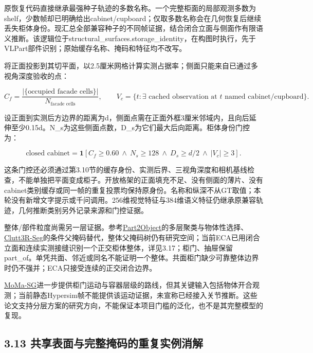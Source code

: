 \documentclass[UTF8,fontset=fandol]{ctexart}
\begin{document}
原恢复代码直接继承最强种子轨迹的多数名称。一个完整柜面的局部观测多数为shelf，少数帧却已明确给出cabinet/cupboard；仅取多数名称会在几何恢复后继续丢失柜体身份。现汇总全部兼容种子的不同帧证据，结合闭合立面与侧面作有限语义推断。该逻辑位于structural\_surfaces.storage\_identity，在构图时执行，先于VLPart部件识别；原始缓存名称、掩码和特征均不改写。



将正面投影到其切平面，以2.5厘米网格计算实测占据率；侧面只能来自已通过多视角深度验收的点：



\[
C_f=\frac{|\{\text{occupied facade cells}\}|}{N_{\text{facade cells}}},\qquad
V_c=\{t:\exists\text{ cached observation at }t\text{ named cabinet/cupboard}\}.
\]

设正面到实测后方边界的距离为d，侧面点需在正面外框3厘米邻域内，且向后延伸至少0.15d。N\_s为这些侧面点数，D\_s为它们最大后向距离。柜体身份门控为：



\[
\text{closed cabinet}=\mathbf1[C_f\ge0.60\ \land\ N_s\ge128\ \land\ D_s\ge d/2\ \land\ |V_c|\ge3].
\]

这条门控还必须通过第3.10节的缓存身份、实测后界、三视角深度和相机基线检查，不能单独把平面变成柜子。开放格架的正面填充不足、没有侧面的薄片、没有cabinet类别缓存或同一帧的重复投票均保持原身份。名称和纵深不从GT取值；本轮没有新增文字提示或千问调用。256维视觉特征与384维语义特征仍继承原兼容轨迹，几何推断类别另外记录来源和门控证据。



整体/部件粒度尚需另一层证据。参考\href{https://www.ecva.net/papers/eccv\_2024/papers\_ECCV/papers/02657.pdf}{Part2Object}的多层聚类与物体性选择、\href{https://arxiv.org/html/2602.11660v1}{Clutt3R-Seg}的条件父掩码替代，整体父掩码树仍有研究空间；当前ECA已用闭合立面和连续实测接缝识别一个正交柜体整体，详见3.17；柜门、抽屉保留part\_of。单凭共面、邻近或同名不能证明一个整体。共面柜门缺少可靠整体边界时仍不强并；ECA只接受连续的正交闭合边界。



\href{https://momasg.cs.uni-freiburg.de/}{MoMa-SG}进一步提供柜门运动与容器层级的路线，但其关键输入包括物体开合观测；当前静态Hypersim帧不能提供该运动证据，未宣称已经接入关节推断。这些论文支持分层方案的研究方向，不能保证本项目门槛的泛化，也不是其完整模型的复现。



\subsection*{3.13 共享表面与完整掩码的重复实例消解}
\end{document}
